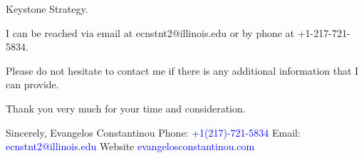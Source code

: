 \documentclass[12pt]{letter}
\begin{document}
\begin{letter}{Keystone Strategy.}


I can be reached via email at ecnstnt2@illinois.edu or by phone at +1-217-721-5834.

Please do not hesitate to contact me if there is any additional information that I can provide.

Thank you very much for your time and consideration.


\noindent Sincerely,
\newline\noindent Evangelos Constantinou
\vspace{4mm}
\newline\noindent Phone: \textcolor{blue}{+1(217)-721-5834}
\newline\noindent Email: \textcolor{blue}{ecnstnt2@illinois.edu}
\newline\noindent Website \textcolor{blue}{evangelosconstantinou.com}
\end{letter}
\end{document}

